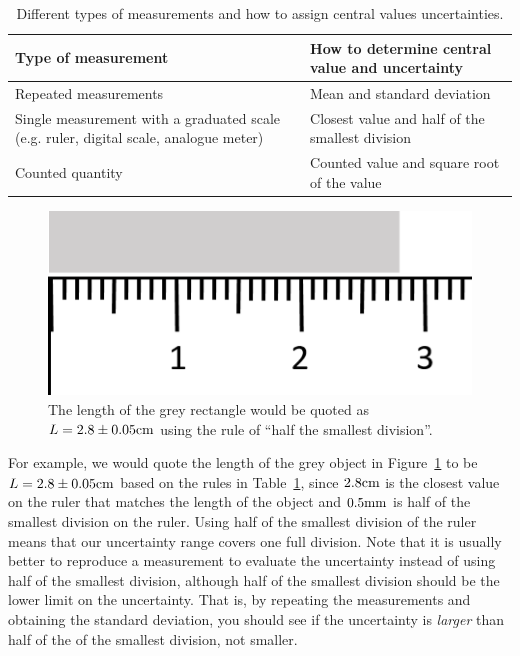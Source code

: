 \begin{table}
\centering
\caption[]{Different types of measurements and how to assign central values uncertainties.}
\label{tab:modelandexperiment:uncertainties}
\begin{tabular}{p{}p{}}
\toprule
\textbf{Type of measurement} & \textbf{How to determine central value and uncertainty} \\
\hline
Repeated measurements & Mean and standard deviation \\
Single measurement with a graduated scale (e.g. ruler, digital scale, analogue meter) & Closest value and half of the smallest division \\
Counted quantity & Counted value and square root of the value \\
\bottomrule
\end{tabular}
\end{table}

\begin{figure}[!htbp]
\centering
\includegraphics[width=0.4\linewidth]{files/ruler-363cbcff3850a55b9c486b9bbf87b570.png}
\caption[]{The length of the grey rectangle would be quoted as $L=2.8\pm0.05 {\rm cm}$ using the rule of ``half the smallest division''.}
\label{fig:modelandexperiment:ruler}
\end{figure}

For example, we would quote the length of the grey object in Figure~\ref{fig:modelandexperiment:ruler} to be $L=2.8\pm0.05 {\rm cm}$ based on the rules in Table~\ref{tab:modelandexperiment:uncertainties}, since $2.8 {\rm cm}$ is the closest value on the ruler that matches the length of the object and $0.5 {\rm mm}$ is half of the smallest division on the ruler. Using half of the smallest division of the ruler means that our uncertainty range covers one full division. Note that it is usually better to reproduce a measurement to evaluate the uncertainty instead of using half of the smallest division, although half of the smallest division should be the lower limit on the uncertainty. That is, by repeating the measurements and obtaining the standard deviation, you should see if the uncertainty is \textit{larger} than half of the of the smallest division, not smaller.

